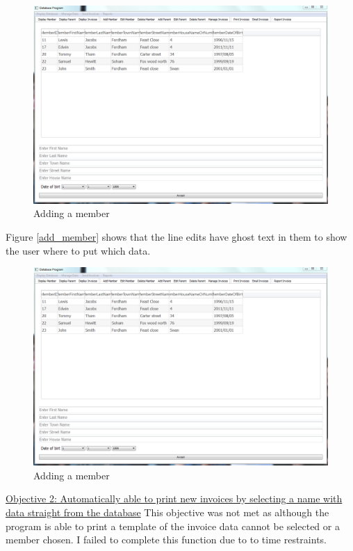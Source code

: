 \begin{figure}[H]
\includegraphics[width=\textwidth]{./Evaluation/Images/AddMember.png}
    \caption{Adding a member} \label{fig:add_member}
\end{figure}
Figure \ref{add_member} shows that the line edits have ghost text in them to show the user where to put which data.

\begin{figure}[H]
\includegraphics[width=\textwidth]{./Evaluation/Images/AddMember.png}
    \caption{Adding a member} \label{fig:add_member}
\end{figure}

\underline{Objective 2: Automatically able to print new invoices by selecting a name with data straight from the database}
This objective was not met as although the program is able to print a template of the invoice data cannot be selected or a member chosen. I failed to complete this function due to to time restraints.

